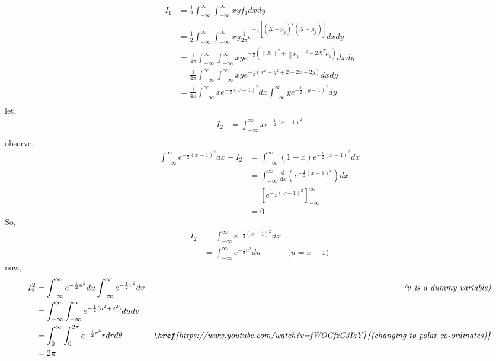 \documentclass{article}
\theoremstyle{remark}
\renewcommand{\vec}[1]{\underline{#1}}
\begin{document}
\begin{align*}
    I_1 &= \frac{1}{2} \int_{-\infty}^{\infty} \int_{-\infty}^{\infty} x y f_1 dx dy \\
    &= \frac{1}{2} \int_{-\infty}^{\infty} \int_{-\infty}^{\infty} x y \frac{1}{2\pi} e^{-\frac{1}{2}[(\vec{X}-\vec{\mu_1})^T(\vec{X}-\vec{\mu_1})]} dx dy \\
    &= \frac{1}{4\pi} \int_{-\infty}^{\infty} \int_{-\infty}^{\infty} x y e^{-\frac{1}{2}\left ( \left \| \vec{X} \right \|^2 + \left \| \vec{\mu_1} \right \|^2 -2 \vec{X}^T\vec{\mu_1} \right )} dx dy\\
    &= \frac{1}{4\pi} \int_{-\infty}^{\infty} \int_{-\infty}^{\infty} xye^{-\frac{1}{2}(x^2+y^2+2-2x-2y)} dx dy \\
    &= \frac{1}{4\pi} \int_{-\infty}^{\infty} x e^{-\frac{1}{2}(x-1)^2} dx \int_{-\infty}^{\infty} y e^{-\frac{1}{2}(y-1)^2}  dy\\
\end{align*}
let,
\begin{align*}
    I_2 &= \int_{-\infty}^{\infty} x e^{-\frac{1}{2}(x-1)^2}\\
\end{align*}
observe,
\begin{align*}
    \int_{-\infty}^{\infty} e^{-\frac{1}{2}(x-1)^2} dx - I_2 &= \int_{-\infty}^{\infty} (1-x) e^{-\frac{1}{2}(x-1)^2} dx\\
    &= \int_{-\infty}^{\infty} \frac{\mathrm{d}}{\mathrm{d} x}\left ( e^{-\frac{1}{2}(x-1)^2} \right ) dx \\
    &= \left [   e^{-\frac{1}{2}(x-1)^2} \right ]_{-\infty}^{\infty} \\
    &= 0
\end{align*}
So,
\begin{align*}
   I_2 &=  \int_{-\infty}^{\infty} e^{-\frac{1}{2}(x-1)^2} dx\\
   &= \int_{-\infty}^{\infty} e^{-\frac{1}{2}u^2} du &\textit{($u=x-1)$}
\end{align*}
now,
\begin{align*}
    I_2^2 &= \int_{-\infty}^{\infty} e^{-\frac{1}{2}u^2} du \int_{-\infty}^{\infty} e^{-\frac{1}{2}v^2} dv &\textit{($v$ is a dummy variable)}
    \\&= \int_{-\infty}^{\infty} \int_{-\infty}^{\infty} e^{-\frac{1}{2}(u^2+v^2)} du dv
    \\&=\int_{0}^{\infty} \int_{0}^{2\pi} e^{-\frac{1}{2}r^2} r dr d\theta &\textit{\href{https://www.youtube.com/watch?v=fWOGfzC3IeY}{(changing to polar co-ordinates)}}\\
    &= 2\pi
\end{align*}
\end{document}
